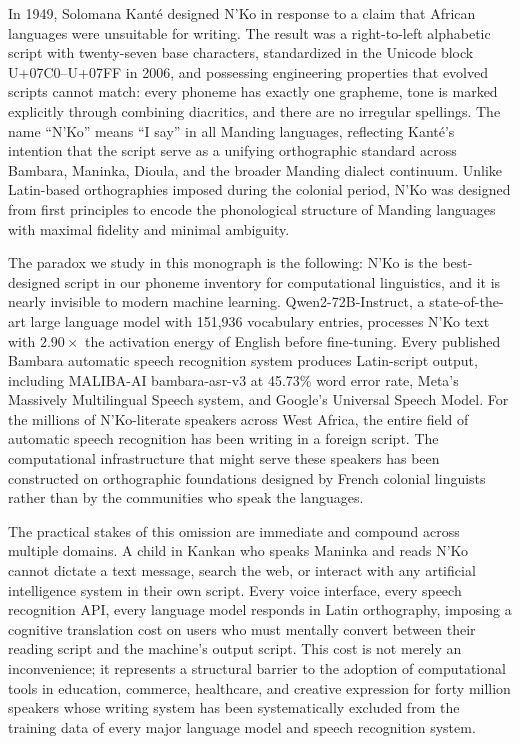 \documentclass[11pt]{article}
\newcommand{\nko}{N'Ko}
\begin{document}
\noindent In 1949, Solomana Kant\'e designed \nko{} in response to a claim that African languages were unsuitable for writing. The result was a right-to-left alphabetic script with twenty-seven base characters, standardized in the Unicode block U+07C0--U+07FF in 2006, and possessing engineering properties that evolved scripts cannot match: every phoneme has exactly one grapheme, tone is marked explicitly through combining diacritics, and there are no irregular spellings. The name ``\nko{}'' means ``I say'' in all Manding languages, reflecting Kant\'e's intention that the script serve as a unifying orthographic standard across Bambara, Maninka, Dioula, and the broader Manding dialect continuum. Unlike Latin-based orthographies imposed during the colonial period, \nko{} was designed from first principles to encode the phonological structure of Manding languages with maximal fidelity and minimal ambiguity.

The paradox we study in this monograph is the following: \nko{} is the best-designed script in our phoneme inventory for computational linguistics, and it is nearly invisible to modern machine learning. Qwen2-72B-Instruct, a state-of-the-art large language model with 151,936 vocabulary entries, processes \nko{} text with $2.90\times$ the activation energy of English before fine-tuning. Every published Bambara automatic speech recognition system produces Latin-script output, including MALIBA-AI bambara-asr-v3 at 45.73\% word error rate, Meta's Massively Multilingual Speech system, and Google's Universal Speech Model. For the millions of \nko{}-literate speakers across West Africa, the entire field of automatic speech recognition has been writing in a foreign script. The computational infrastructure that might serve these speakers has been constructed on orthographic foundations designed by French colonial linguists rather than by the communities who speak the languages.

The practical stakes of this omission are immediate and compound across multiple domains. A child in Kankan who speaks Maninka and reads \nko{} cannot dictate a text message, search the web, or interact with any artificial intelligence system in their own script. Every voice interface, every speech recognition API, every language model responds in Latin orthography, imposing a cognitive translation cost on users who must mentally convert between their reading script and the machine's output script. This cost is not merely an inconvenience; it represents a structural barrier to the adoption of computational tools in education, commerce, healthcare, and creative expression for forty million speakers whose writing system has been systematically excluded from the training data of every major language model and speech recognition system.
\end{document}
